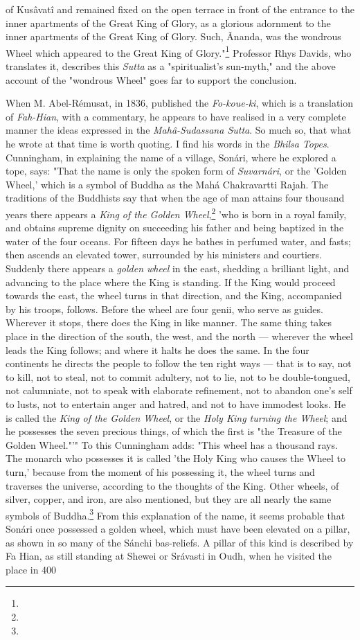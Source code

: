 \documentclass[a4paper, 11pt, oneside, polutonikogreek, english]{article}
\begin{document}
of Kusâvatî and remained fixed on the open terrace in front of the entrance to the inner apartments of the Great King of Glory, as a glorious adornment to the inner apartments of the Great King of Glory. Such, Ânanda, was the wondrous Wheel which appeared to the Great King of Glory."\footnote{} Professor Rhys Davids, who translates it, describes this \emph{Sutta} as a "spiritualist's sun-myth," and the above account of the "wondrous Wheel" goes far to support the conclusion.

When M. Abel-Rémusat, in 1836, published the \emph{Fo-koue-ki}, which is a translation of \emph{Fah-Hian}, with a commentary, he appears to have realised in a very complete manner the ideas expressed in the \emph{Mahâ-Sudassana Sutta}. So much so, that what he wrote at that time is worth quoting. I find his words in the \emph{Bhilsa Topes}. Cunningham, in explaining the name of a village, Sonári, where he explored a tope, says: "That the name is only the spoken form of \emph{Suvarnári}, or the 'Golden Wheel,' which is a symbol of Buddha as the Mahá Chakravartti Rajah. The traditions of the Buddhists say that when the age of man attains four thousand years there appears a \emph{King of the Golden Wheel},\footnote{} 'who is born in a royal family, and obtains supreme dignity on succeeding his father and being baptized in the water of the four oceans. For fifteen days he bathes in perfumed water, and fasts; then ascends an elevated tower, surrounded by his ministers and courtiers. Suddenly there appears a \emph{golden wheel} in the east, shedding a brilliant light, and advancing to the place where the King is standing. If the King would proceed towards the east, the wheel turns in that direction, and the King, accompanied by his troops, follows. Before the wheel are four genii, who serve as guides. Wherever it stops, there does the King in like manner. The same thing takes place in the direction of the south, the west, and the north --- wherever the wheel leads the King follows; and where it halts he does the same. In the four continents he directs the people to follow the ten right ways --- that is to say, not to kill, not to steal, not to commit adultery, not to lie, not to be double-tongued, not calumniate, not to speak with elaborate refinement, not to abandon one's self to lusts, not to entertain anger and hatred, and not to have immodest looks. He is called the \emph{King of the Golden Wheel}, or the \emph{Holy King turning the Wheel}; and he possesses the seven precious things, of which the first is "the Treasure of the Golden Wheel."'" To this Cunningham adds: "This wheel has a thousand rays. The monarch who possesses it is called 'the Holy King who causes the Wheel to turn,' because from the moment of his possessing it, the wheel turns and traverses the universe, according to the thoughts of the King. Other wheels, of silver, copper, and iron, are also mentioned, but they are all nearly the same symbols of Buddha.\footnote{} From this explanation of the name, it seems probable that Sonári once possessed a golden wheel, which must have been elevated on a pillar, as shown in so many of the Sánchi bas-reliefs. A pillar of this kind is described by Fa Hian, as still standing at Shewei or Srávasti in Oudh, when he visited the place in 400 
\end{document}
